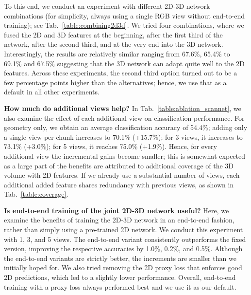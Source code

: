 To this end, we conduct an experiment with different 2D-3D network combinations (for simplicity, always using a single RGB view without end-to-end training); see Tab.~\ref{table:combining2d3d}.
We tried four combinations, where we fused the 2D and 3D features at the beginning, after the first third of the network, after the second third, and at the very end into the 3D network.
Interestingly, the results are relatively similar ranging from 67.6\%, 65.4\% to 69.1\% and 67.5\% suggesting that the 3D network can adapt quite well to the 2D features. Across these experiments, the second third option turned out to be a few percentage points higher than the alternatives; hence, we use that as a default in all other experiments.


\vspace{0.2cm}\noindent
\textbf{How much do additional views help?}
In Tab.~\ref{table:ablation_scannet}, we also examine the effect of each additional view on classification performance.
For geometry only, we obtain an average classification accuracy of 54.4\%; adding only a single view per chunk increases to 70.1\% (+15.7\%); for 3 views, it increases to 73.1\% (+3.0\%); for 5 views, it reaches 75.0\% (+1.9\%).
Hence, for every additional view the incremental gains become smaller; this is somewhat expected as a large part of the benefits are attributed to additional coverage of the 3D volume with 2D features.
If we already use a substantial number of views, each additional added feature shares redundancy with previous views, as shown in Tab.~\ref{table:coverage}.


\vspace{0.2cm}\noindent
\textbf{Is end-to-end training of the joint 2D-3D network useful?}
Here, we examine the benefits of training the 2D-3D network in an end-to-end fashion, rather than simply using a pre-trained 2D network.
We conduct this experiment with 1, 3, and 5 views.
The end-to-end variant consistently outperforms the fixed version, improving the respective accuracies by 1.0\%, 0.2\%, and 0.5\%.
Although the end-to-end variants are strictly better, the increments are smaller than we initially hoped for.
We also tried removing the 2D proxy loss that enforces good 2D predictions, which led to a slightly lower performance.
Overall, end-to-end training with a proxy loss always performed best and we use it as our default.



\vspace{-0.5cm}

